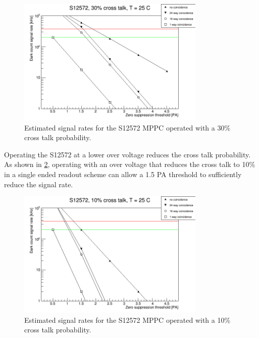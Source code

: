\documentclass[a4paper]{article}
\begin{document}
\begin{figure}[htp]
    \begin{center}
        \includegraphics[width=0.8\textwidth]{imgs/g_s12572_30pct}
        \caption{Estimated signal rates for the S12572 MPPC operated with a 30\% cross talk probability.}
        \label{rates_s12572_30pct}
    \end{center}
\end{figure}

Operating the S12572 at a lower over voltage reduces the cross talk probability.
As shown in \cref{rates_s12572_10pct}, operating with an over voltage that reduces the cross talk to 10\% in a single ended readout scheme can allow a 1.5 PA threshold to sufficiently reduce the signal rate.

\begin{figure}[htp]
    \begin{center}
        \includegraphics[width=0.8\textwidth]{imgs/g_s12572_10pct}
        \caption{Estimated signal rates for the S12572 MPPC operated with a 10\% cross talk probability.}
        \label{rates_s12572_10pct}
    \end{center}
\end{figure}
\end{document}
